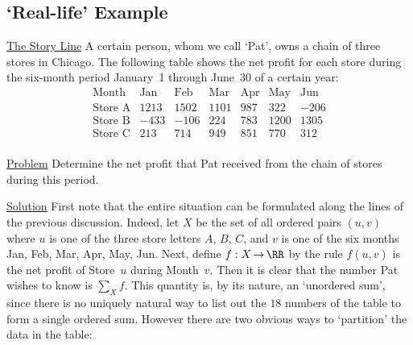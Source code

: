 {\V
\V

            \subsection{\small{\bf `Real-life' Example}}
            \label{ExampB10.95}

        \underline{The Story Line} A certain person, whom we call `Pat', owns a chain of three stores in Chicago.
    The following table shows the net profit for each store during the six-month period January~1 through June~30 of a certain year:
        \begin{displaymath}
        \begin{array}{c|rrrrrr}  \hline
        \mbox{Month}   &
  \mbox{Jan} & \mbox{Feb} & \mbox{Mar} & \mbox{Apr} & \mbox{May} & \mbox{Jun} \\
        \mbox{Store A} &
       1213  &   1502     &    1101    &    987     &    322     &  -206      \\
        \mbox{Store B} &
       -433  &   -106     &     224    &    783     &   1200     &  1305      \\
        \mbox{Store C} &
        213  &    714     &     949    &    851     &    770     &   312      \\
        \end{array}
        \end{displaymath}

        \underline{Problem} Determine the net profit that Pat received from the chain of stores during this period.

        \underline{Solution} First note that the entire  situation can be  formulated along the lines of the previous discussion.
    Indeed, let $X$ be the set of all ordered pairs $(u,v)$ where $u$ is one of the three store letters $A$, $B$, $C$, and $v$ is one of the six months Jan, Feb, Mar, Apr, May, Jun.
    Next, define $f:X \,{\rightarrow}\, {\RR}$ by the rule $f(u,v)$ is the net profit of Store~$u$ during Month~$v$.
    Then it is clear that the number Pat wishes to know is ${\sum}_{X} f$. 
    This quantity is, by its nature, an `unordered sum', since there is no uniquely natural way to list out the $18$ numbers of the table to form a single ordered sum.
    However there are two obvious ways to `partition' the data in the table:

}
